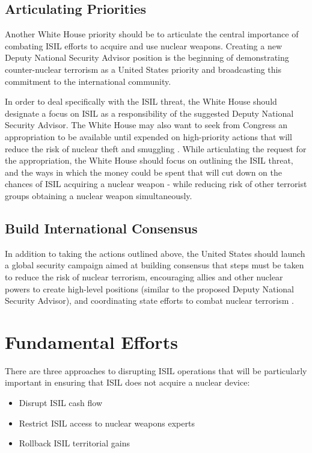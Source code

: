 \documentclass{report}
\begin{document}
\subsection{Articulating Priorities}

Another White House priority should be to articulate the central importance of combating ISIL efforts to acquire and use nuclear weapons. Creating a new Deputy National Security Advisor position is the beginning of demonstrating counter-nuclear terrorism as a United States priority and broadcasting this commitment to the international community. 

In order to deal specifically with the ISIL threat, the White House should designate a focus on ISIL as a responsibility of the suggested Deputy National Security Advisor. The White House may also want to seek from Congress an appropriation to be available until expended on high-priority actions that will reduce the risk of nuclear theft and smuggling \cite{Bronner2008}. While articulating the request for the appropriation, the White House should focus on outlining the ISIL threat, and the ways in which the money could be spent that will cut down on the chances of ISIL acquiring a nuclear weapon - while reducing risk of other terrorist groups obtaining a nuclear weapon simultaneously. 

\subsection{Build International Consensus}

In addition to taking the actions outlined above, the United States should launch a global security campaign aimed at building consensus that steps must be taken to reduce the risk of nuclear terrorism, encouraging allies and other nuclear powers to create high-level positions (similar to the proposed Deputy National Security Advisor), and coordinating state efforts to combat nuclear terrorism \cite{Ferguson2006}. 





\section{Fundamental Efforts}


There are three approaches to disrupting ISIL operations that will be particularly important in ensuring that ISIL does not acquire a nuclear device:

\begin{itemize}
 \item Disrupt ISIL cash flow
 \item Restrict ISIL access to nuclear weapons experts
 \item Rollback ISIL territorial gains
\end{itemize}
\end{document}

